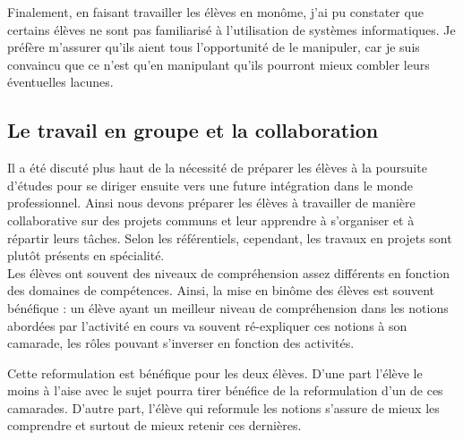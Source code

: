 \documentclass[pdftex,a4paper,12pt]{article}
\begin{document}
	Finalement, en faisant travailler les élèves en monôme, j'ai pu constater que certains élèves ne sont pas familiarisé à l'utilisation de systèmes informatiques.
	Je préfère m'assurer qu'ils aient tous l'opportunité de le manipuler, 
	car je suis convaincu que ce n'est qu'en manipulant qu'ils pourront mieux combler leurs éventuelles lacunes.

	\subsection{Le travail en groupe et la collaboration}
	Il a été discuté plus haut de la nécessité de préparer les élèves à la poursuite d'études 
	pour se diriger ensuite vers une future intégration dans le monde professionnel.
	Ainsi nous devons préparer les élèves à travailler de manière collaborative sur des projets communs et leur apprendre à s'organiser et à répartir leurs tâches.
	Selon les référentiels, cependant, les travaux en projets sont plutôt présents en spécialité.\\

	Les élèves ont souvent des niveaux de compréhension assez différents en fonction des domaines de compétences.
	Ainsi, la mise en binôme des élèves est souvent bénéfique : 
	un élève ayant un meilleur niveau de compréhension dans les notions abordées par l'activité en cours va souvent ré-expliquer ces notions à son camarade,
	les rôles pouvant s'inverser en fonction des activités.

	Cette reformulation est bénéfique pour les deux élèves.
	D'une part l'élève le moins à l'aise avec le sujet pourra tirer bénéfice de la reformulation d'un de ces camarades.
	D'autre part, l'élève qui reformule les notions s'assure de mieux les comprendre et surtout de mieux retenir ces dernières.
\end{document}
